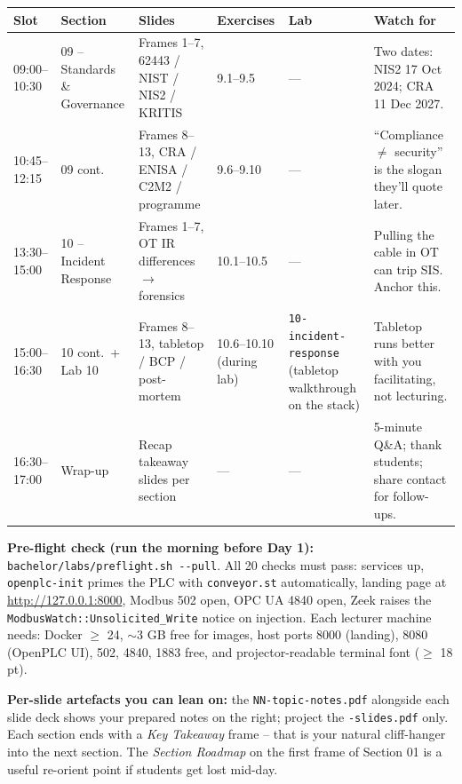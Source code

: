 \documentclass[10pt,a4paper,landscape]{article}
\newcommand{\hint}[1]{%
  \begin{tcolorbox}[colback=tipBg, colframe=slideBlue, boxrule=0.4pt, arc=2pt,
    left=2mm, right=2mm, top=1mm, bottom=1mm, fontupper=\footnotesize]%
  #1%
  \end{tcolorbox}%
}
\begin{document}
\begin{tabular}{|p{2.2cm}|p{4.0cm}|p{4.2cm}|p{4.0cm}|p{4.8cm}|p{4.0cm}|}
\hline
\rowcolor{slidePanel}
\textbf{Slot} & \textbf{Section} & \textbf{Slides} & \textbf{Exercises} & \textbf{Lab} & \textbf{Watch for} \\
\hline
09:00--10:30 & 09 -- Standards \& Governance & Frames 1--7, 62443 / NIST / NIS2 / KRITIS & 9.1--9.5 & --- & Two dates: NIS2 17 Oct 2024; CRA 11 Dec 2027. \\
\hline
10:45--12:15 & 09 cont. & Frames 8--13, CRA / ENISA / C2M2 / programme & 9.6--9.10 & --- & ``Compliance $\neq$ security'' is the slogan they'll quote later. \\
\hline
13:30--15:00 & 10 -- Incident Response & Frames 1--7, OT IR differences $\to$ forensics & 10.1--10.5 & --- & Pulling the cable in OT can trip SIS. Anchor this. \\
\hline
15:00--16:30 & 10 cont.\ + Lab 10 & Frames 8--13, tabletop / BCP / post-mortem & 10.6--10.10 (during lab) & \texttt{10-incident-response} (tabletop walkthrough on the stack) & Tabletop runs better with you facilitating, not lecturing. \\
\hline
16:30--17:00 & Wrap-up & Recap takeaway slides per section & --- & --- & 5-minute Q\&A; thank students; share contact for follow-ups. \\
\hline
\end{tabular}

\vspace{3mm}

\hint{%
\textbf{Pre-flight check (run the morning before Day 1):}
\texttt{bachelor/labs/preflight.sh -{}-pull}.
All 20 checks must pass: services up, \texttt{openplc-init} primes the PLC with \texttt{conveyor.st} automatically, landing page at \url{http://127.0.0.1:8000}, Modbus 502 open, OPC UA 4840 open, Zeek raises the \texttt{ModbusWatch::Unsolicited\_Write} notice on injection.
Each lecturer machine needs: Docker $\geq$ 24, $\sim$3 GB free for images, host ports 8000 (landing), 8080 (OpenPLC UI), 502, 4840, 1883 free, and projector-readable terminal font ($\geq$ 18 pt).
}

\hint{%
\textbf{Per-slide artefacts you can lean on:}
the \texttt{NN-topic-notes.pdf} alongside each slide deck shows your prepared notes on the right; project the \texttt{-slides.pdf} only.
Each section ends with a \emph{Key Takeaway} frame -- that is your natural cliff-hanger into the next section. The \emph{Section Roadmap} on the first frame of Section 01 is a useful re-orient point if students get lost mid-day.
}
\end{document}

